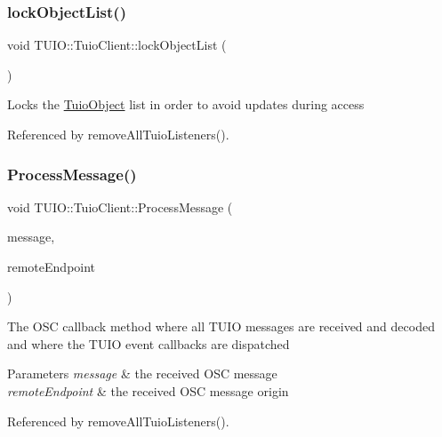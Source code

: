 \subsubsection{\texorpdfstring{lock\+Object\+List()}{lockObjectList()}}
{\footnotesize\ttfamily void T\+U\+I\+O\+::\+Tuio\+Client\+::lock\+Object\+List (\begin{DoxyParamCaption}{ }\end{DoxyParamCaption})}

Locks the \hyperlink{class_t_u_i_o_1_1_tuio_object}{Tuio\+Object} list in order to avoid updates during access 

Referenced by remove\+All\+Tuio\+Listeners().

\mbox{\label{class_t_u_i_o_1_1_tuio_client_adac258ff4e62e178dc2f5a89f0965d73}} 
\subsubsection{\texorpdfstring{Process\+Message()}{ProcessMessage()}}
{\footnotesize\ttfamily void T\+U\+I\+O\+::\+Tuio\+Client\+::\+Process\+Message (\begin{DoxyParamCaption}\item[{const osc\+::\+Received\+Message \&}]{message,  }\item[{const Ip\+Endpoint\+Name \&}]{remote\+Endpoint }\end{DoxyParamCaption})\hspace{0.3cm}{\ttfamily [protected]}}

The O\+SC callback method where all T\+U\+IO messages are received and decoded and where the T\+U\+IO event callbacks are dispatched


\begin{DoxyParams}{Parameters}
{\em message} & the received O\+SC message \\
\hline
{\em remote\+Endpoint} & the received O\+SC message origin \\
\hline
\end{DoxyParams}


Referenced by remove\+All\+Tuio\+Listeners().

\mbox{\label{class_t_u_i_o_1_1_tuio_client_ad7fb92acb9a481aadb3620168e44735f}} 
